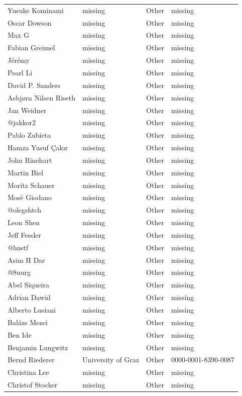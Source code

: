\begin{longtable}{p{4cm}p{4cm}ll}
  Yusuke Kominami & missing & Other & missing \\
  Oscar Dowson & missing & Other & missing \\
  Max G & missing & Other & missing \\
  Fabian Greimel & missing & Other & missing \\
  Jérémy & missing & Other & missing \\
  Pearl Li & missing & Other & missing \\
  David P. Sanders & missing & Other & missing \\
  Asbjørn Nilsen Riseth & missing & Other & missing \\
  Jan Weidner & missing & Other & missing \\
  @jakkor2 & missing & Other & missing \\
  Pablo Zubieta & missing & Other & missing \\
  Hamza Yusuf Çakır & missing & Other & missing \\
  John Rinehart & missing & Other & missing \\
  Martin Biel & missing & Other & missing \\
  Moritz Schauer & missing & Other & missing \\
  Mosè Giodano & missing & Other & missing \\
  @olegshtch & missing & Other & missing \\
  Leon Shen & missing & Other & missing \\
  Jeff Fessler & missing & Other & missing \\
  @hustf & missing & Other & missing \\
  Asim H Dar & missing & Other & missing \\
  @8uurg & missing & Other & missing \\
  Abel Siqueira & missing & Other & missing \\
  Adrian Dawid & missing & Other & missing \\
  Alberto Lusiani & missing & Other & missing \\
  Balázs Mezei & missing & Other & missing \\
  Ben Ide & missing & Other & missing \\
  Benjamin Lungwitz & missing & Other & missing \\
  Bernd Riederer & University of Graz & Other & 0000-0001-8390-0087 \\
  Christina Lee & missing & Other & missing \\
  Christof Stocker & missing & Other & missing \\

\end{longtable}
